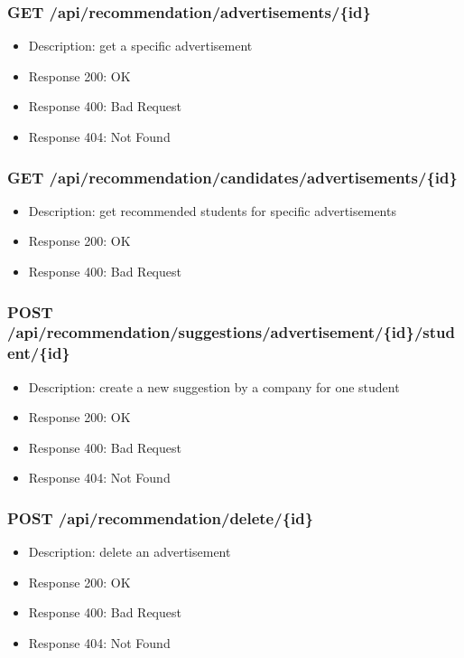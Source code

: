 \subsubsection{GET /api/recommendation/advertisements/\{id\}}
\begin{itemize}
    \item Description: get a specific advertisement
    \item Response 200: OK
    \item Response 400: Bad Request
    \item Response 404: Not Found
\end{itemize}

\subsubsection{GET /api/recommendation/candidates/advertisements/\{id\}}
\begin{itemize}
    \item Description: get recommended students for specific advertisements
    \item Response 200: OK
    \item Response 400: Bad Request
\end{itemize}

\subsubsection{POST /api/recommendation/suggestions/advertisement/\{id\}/student/\{id\}}
\begin{itemize}
    \item Description: create a new suggestion by a company for one student
    \item Response 200: OK
    \item Response 400: Bad Request
    \item Response 404: Not Found
\end{itemize}

\subsubsection{POST /api/recommendation/delete/\{id\}}
\begin{itemize}
    \item Description: delete an advertisement
    \item Response 200: OK
    \item Response 400: Bad Request
    \item Response 404: Not Found
\end{itemize}


